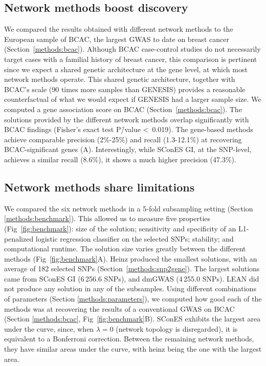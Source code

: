 \documentclass[10pt,letterpaper]{article}
\begin{document}
\subsection{Network methods boost discovery}
\label{results:boost}

We compared the results obtained with different network methods to the European sample of BCAC, the largest GWAS to date on breast cancer (Section~\ref{methods:bcac}). Although BCAC case-control studies do not necessarily target cases with a familial history of breast cancer, this comparison is pertinent since we expect a shared genetic architecture at the gene level, at which most network methods operate. This shared genetic architecture, together with BCAC's scale (90 times more samples than GENESIS) provides a reasonable counterfactual of what we would expect if GENESIS had a larger sample size. We computed a gene association score on BCAC (Section~\ref{methods:bcac}). The solutions provided by the different  network methods overlap significantly with BCAC findings (Fisher's exact test P\=/value \textless~0.019). The gene-based methods achieve comparable precision (2\%-25\%) and recall (1.3-12.1\%) at recovering BCAC-significant genes (A). Interestingly, while SConES GI, at the SNP-level, achieves a similar recall (8.6\%), it shows a much higher precision (47.3\%).

\subsection{Network methods share limitations}
\label{results:benchmark}

We compared the six network methods in a 5-fold subsampling setting (Section \ref{methods:benchmark}). This allowed us to measure five properties (Fig~\ref{fig:benchmark}): size of the solution; sensitivity and specificity of an L1-penalized logistic regression classifier on the selected SNPs; stability; and computational runtime. The solution size varies greatly between the different methods (Fig~\ref{fig:benchmark}A). Heinz produced the smallest solutions, with an average of 182 selected SNPs (Section~\ref{methods:snp2gene}). The largest solutions came from SConES GI (6\,256.6 SNPs), and dmGWAS (4\,255.0 SNPs). LEAN did not produce any solution in any of the subsamples. Using different combinations of parameters (Section \ref{methods:parameters}), we computed how good each of the methods was at recovering the results of a conventional GWAS on BCAC (Section \ref{methods:bcac}, Fig~\ref{fig:benchmark}B). SConES exhibits the largest area under the curve, since, when $\lambda = 0$ (network topology is disregarded), it is equivalent to a Bonferroni correction. Between the remaining network methods, they have similar areas under the curve, with heinz being the one with the largest area.
\end{document}
